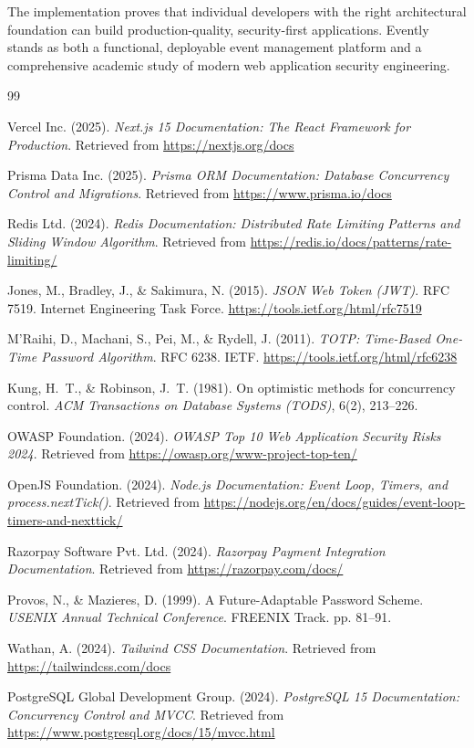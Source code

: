 \documentclass[12pt,a4paper]{report}
\begin{document}
The implementation proves that individual developers with the right architectural foundation can build production-quality, security-first applications. Evently stands as both a functional, deployable event management platform and a comprehensive academic study of modern web application security engineering.

\clearpage
{}
{}
\begin{thebibliography}{99}

    Vercel Inc. (2025). \textit{Next.js 15 Documentation: The React Framework for Production}. Retrieved from \url{https://nextjs.org/docs}

    Prisma Data Inc. (2025). \textit{Prisma ORM Documentation: Database Concurrency Control and Migrations}. Retrieved from \url{https://www.prisma.io/docs}

    Redis Ltd. (2024). \textit{Redis Documentation: Distributed Rate Limiting Patterns and Sliding Window Algorithm}. Retrieved from \url{https://redis.io/docs/patterns/rate-limiting/}

    Jones, M., Bradley, J., \& Sakimura, N. (2015). \textit{JSON Web Token (JWT)}. RFC 7519. Internet Engineering Task Force. \url{https://tools.ietf.org/html/rfc7519}

    M'Raihi, D., Machani, S., Pei, M., \& Rydell, J. (2011). \textit{TOTP: Time-Based One-Time Password Algorithm}. RFC 6238. IETF. \url{https://tools.ietf.org/html/rfc6238}

    Kung, H.~T., \& Robinson, J.~T. (1981). On optimistic methods for concurrency control. \textit{ACM Transactions on Database Systems (TODS)}, 6(2), 213--226.

    OWASP Foundation. (2024). \textit{OWASP Top 10 Web Application Security Risks 2024}. Retrieved from \url{https://owasp.org/www-project-top-ten/}

    OpenJS Foundation. (2024). \textit{Node.js Documentation: Event Loop, Timers, and process.nextTick()}. Retrieved from \url{https://nodejs.org/en/docs/guides/event-loop-timers-and-nexttick/}

    Razorpay Software Pvt. Ltd. (2024). \textit{Razorpay Payment Integration Documentation}. Retrieved from \url{https://razorpay.com/docs/}

    Provos, N., \& Mazieres, D. (1999). A Future-Adaptable Password Scheme. \textit{USENIX Annual Technical Conference}. FREENIX Track. pp. 81--91.

    Wathan, A. (2024). \textit{Tailwind CSS Documentation}. Retrieved from \url{https://tailwindcss.com/docs}

    PostgreSQL Global Development Group. (2024). \textit{PostgreSQL 15 Documentation: Concurrency Control and MVCC}. Retrieved from \url{https://www.postgresql.org/docs/15/mvcc.html}

\end{thebibliography}
\end{document}
